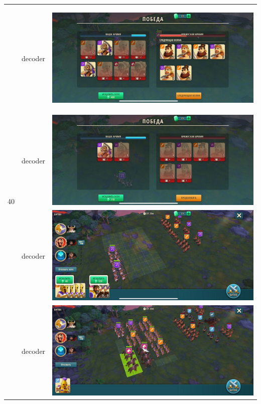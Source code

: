\begin{longtable}{|c|c|c|}
	\hline
	\multirow{4}{*}{40} & decoder &
	\hypertarget{fight40}{\includegraphics[width=0.75\linewidth]{./parts/media/TreasureHunt/40/decoder/photo_2022-04-07_13-16-08.jpg}} \\
	& decoder &
	\includegraphics[width=0.75\linewidth]{./parts/media/TreasureHunt/40/decoder/photo_2022-04-07_13-16-15.jpg} \\
	& decoder &
	\includegraphics[width=0.75\linewidth]{./parts/media/TreasureHunt/40/decoder/photo_2022-04-07_13-16-12.jpg} \\
	& decoder &
	\includegraphics[width=0.75\linewidth]{./parts/media/TreasureHunt/40/decoder/photo_2022-04-07_13-15-51.jpg} \\
	\hline
\end{longtable}
